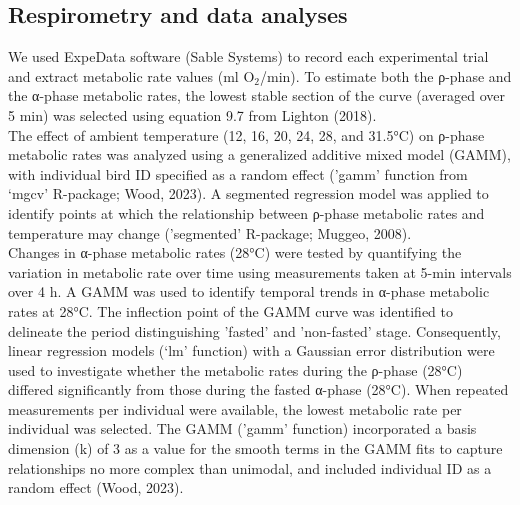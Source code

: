 \documentclass[10pt, twoside]{book} %
\begin{document}
\subsection{Respirometry and data analyses}
We used ExpeData software (Sable Systems) to record each experimental trial and extract metabolic rate values (ml O$_{\text{2}}$/min). To estimate both the ρ-phase and the α-phase metabolic rates, the lowest stable section of the curve (averaged over 5 min) was selected using equation 9.7 from Lighton (2018).\\

The effect of ambient temperature (12, 16, 20, 24, 28, and 31.5°C) on ρ-phase metabolic rates was analyzed using a generalized additive mixed model (GAMM), with individual bird ID specified as a random effect ('gamm' function from ‘mgcv’ R-package; Wood, 2023). A segmented regression model was applied to identify points at which the relationship between ρ-phase metabolic rates and temperature may change ('segmented' R-package; Muggeo, 2008).\\

Changes in α-phase metabolic rates (28°C) were tested by quantifying the variation in metabolic rate over time using measurements taken at 5-min intervals over 4 h. A GAMM was used to identify temporal trends in α-phase metabolic rates at 28°C. The inflection point of the GAMM curve was identified to delineate the period distinguishing 'fasted' and 'non-fasted' stage. Consequently, linear regression models (‘lm’ function) with a Gaussian error distribution were used to investigate whether the metabolic rates during the ρ-phase (28°C) differed significantly from those during the fasted α-phase (28°C). When repeated measurements per individual were available, the lowest metabolic rate per individual was selected. The GAMM ('gamm' function) incorporated a basis dimension (k) of 3 as a value for the smooth terms in the GAMM fits to capture relationships no more complex than unimodal, and included individual ID as a random effect (Wood, 2023). \\
\end{document}

